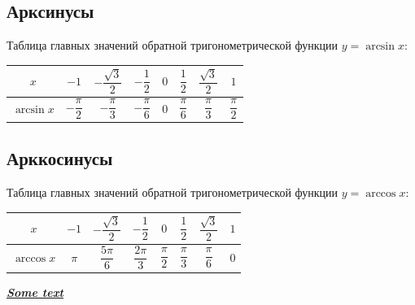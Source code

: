 \documentclass[11pt, latterpaper]{article}
\begin{document}
\subsection{Арксинусы}
Таблица главных значений обратной тригонометрической функции $y = \arcsin x$:
\begin{center}
\renewcommand{\arraystretch}{2}
\begin{tabular}{|c|c|c|c|c|c|c|c|}
\hline
$x$ & $-1$ & $-\dfrac{\sqrt{3}}{2}$ & $-\dfrac{1}{2}$ & $0$ & $\dfrac{1}{2}$ & $\dfrac{\sqrt{3}}{2}$ & $1$ \\ \hline
$\arcsin x$ & $-\dfrac{\pi}{2}$ & $-\dfrac{\pi}{3}$ & $-\dfrac{\pi}{6}$ & $0$ & $\dfrac{\pi}{6}$ & $\dfrac{\pi}{3}$ & $\dfrac{\pi}{2}$ \\ \hline
\end{tabular}
\end{center}

\subsection{Арккосинусы}
Таблица главных значений обратной тригонометрической функции $y = \arccos x$:
\begin{center}
\renewcommand{\arraystretch}{2}
\begin{tabular}{|c|c|c|c|c|c|c|c|}
\hline
$x$ & $-1$ & $-\dfrac{\sqrt{3}}{2}$ & $-\dfrac{1}{2}$ & $0$ & $\dfrac{1}{2}$ & $\dfrac{\sqrt{3}}{2}$ & $1$ \\ \hline
$\arccos x$ & $\pi$ & $\dfrac{5\pi}{6}$ & $\dfrac{2\pi}{3}$ & $\dfrac{\pi}{2}$ & $\dfrac{\pi}{3}$ & $\dfrac{\pi}{6}$ & $0$ \\ \hline
\end{tabular}
\end{center}

\textit{\underline{\textbf{Some text}}}
\end{document}
